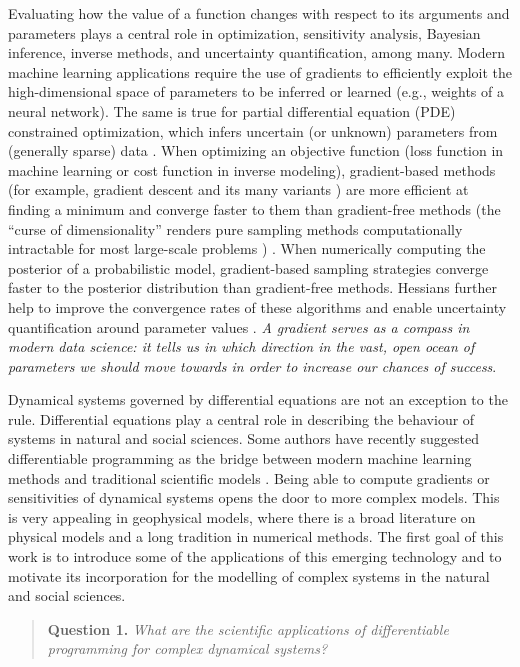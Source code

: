 Evaluating how the value of a function changes with respect to its arguments and parameters plays a central role in optimization, sensitivity analysis, Bayesian inference, inverse methods, and uncertainty quantification, among many\cite{Razavi.2021}. 
Modern machine learning applications require the use of gradients to efficiently exploit  the high-dimensional space of parameters to be inferred or learned (e.g., weights of a neural network). 
The same is true for partial differential equation (PDE) constrained optimization, which infers uncertain (or unknown) parameters from (generally sparse) data  \cite{Ghattas.2021}.
When optimizing an objective function (loss function in machine learning or cost function in inverse modeling), gradient-based methods (for example, gradient descent and its many variants \cite{ruder2016overview-gradient-descent}) are more efficient at finding a minimum and converge faster to them than gradient-free methods
(the ``curse of dimensionality'' renders pure sampling methods computationally intractable for most large-scale problems \cite{Oden:2010tv})
.
When numerically computing the posterior of a probabilistic model, gradient-based sampling strategies converge faster to the posterior distribution than gradient-free methods. 
Hessians further help to improve the convergence rates of these algorithms and enable uncertainty quantification around parameter values \cite{BuiThanh:2012ul}.
\textit{A gradient serves as a compass in modern data science: it tells us in which direction in the vast, open ocean of parameters we should move towards in order to increase our chances of success}.  

Dynamical systems governed by differential equations are not an exception to the rule.
Differential equations play a central role in describing the behaviour of systems in natural and social sciences. 
Some authors have recently suggested differentiable programming as the bridge between modern machine learning methods and traditional scientific models \cite{Ramsundar_Krishnamurthy_Viswanathan_2021, Shen_diff_modelling, Gelbrecht-differential-programming-Earth}. 
Being able to compute gradients or sensitivities of dynamical systems opens the door to more complex models.
This is very appealing in geophysical models, where there is a broad literature on physical models and a long tradition in numerical methods. 
The first goal of this work is to introduce some of the applications of this emerging technology and to motivate its incorporation for the modelling of complex systems in the natural and social sciences. 
\begin{quote}
    \textbf{Question 1. }
    \textit{What are the scientific applications of differentiable programming for complex dynamical systems?}
\end{quote}


